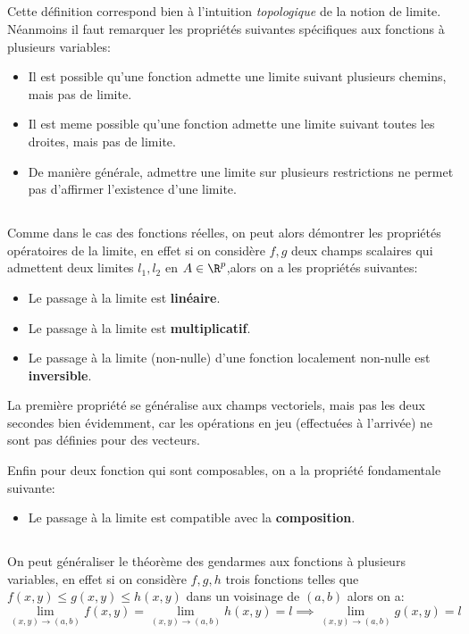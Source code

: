 \subsection*{}
Cette définition correspond bien à l'intuition \textit{topologique} de la notion de limite. Néanmoins il faut remarquer les propriétés suivantes spécifiques aux fonctions à plusieurs variables:
\begin{itemize}
   \item Il est possible qu'une fonction admette une limite suivant plusieurs chemins, mais pas de limite.
   \item Il est meme possible qu'une fonction admette une limite suivant toutes les droites, mais pas de limite.
   \item De manière générale, admettre une limite sur plusieurs restrictions ne permet pas d'affirmer l'existence d'une limite.
\end{itemize}
\subsection*{}
Comme dans le cas des fonctions réelles, on peut alors démontrer les propriétés opératoires de la limite, en effet si on considère \(f, g\) deux champs scalaires qui admettent deux limites \(l_1, l_2\) en \(A \in \R^p\),alors on a les propriétés suivantes:
\begin{itemize}
   \item Le passage à la limite est \textbf{linéaire}.
   \item Le passage à la limite est \textbf{multiplicatif}.
   \item Le passage à la limite (non-nulle) d'une fonction localement non-nulle est \textbf{inversible}.
\end{itemize}
La première propriété se généralise aux champs vectoriels, mais pas les deux secondes bien évidemment, car les opérations en jeu (effectuées à l'arrivée) ne sont pas définies pour des vecteurs.\<

Enfin pour deux fonction qui sont composables, on a la propriété fondamentale suivante:
\begin{itemize}
   \item Le passage à la limite est compatible avec la \textbf{composition}.
\end{itemize}
\subsection*{}
On peut généraliser le théorème des gendarmes aux fonctions à plusieurs variables, en effet si on considère \(f, g, h\) trois fonctions telles que \(f(x, y) \leq g(x, y) \leq h(x, y)\) dans un voisinage de \((a, b)\) alors on a:
\[
   \lim_{(x, y) \rightarrow (a, b)} f(x, y) = \lim_{(x, y) \rightarrow (a, b)} h(x, y) = l \implies \lim_{(x, y) \rightarrow (a, b)} g(x, y) = l
\] 
\pagebreak
